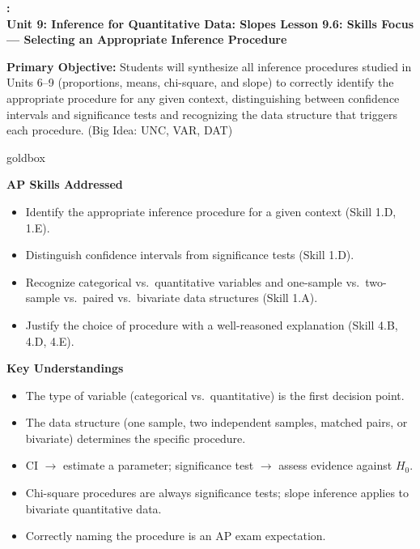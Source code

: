 \documentclass[10pt]{article}
\newcommand{\UnitNumberName}{Unit 9: Inference for Quantitative Data: Slopes \quad}
\newcommand{\LessonNumberName}{Lesson 9.6: Skills Focus --- Selecting an Appropriate Inference Procedure}
\begin{document}
\begin{center}
    {\Large\bfseries \CourseName: \SchoolYear \\
    {\small\bfseries \UnitNumberName \LessonNumberName}}
\end{center}

\begin{tcolorbox}[colback=sky, colframe=navy, boxrule=0.9pt, arc=2mm,
    left=2mm, right=2mm, top=1.5mm, bottom=1.5mm]
    \textbf{Primary Objective:} Students will synthesize all inference procedures studied
    in Units 6--9 (proportions, means, chi-square, and slope) to correctly identify the
    appropriate procedure for any given context, distinguishing between confidence intervals
    and significance tests and recognizing the data structure that triggers each procedure.
    (Big Idea: UNC, VAR, DAT)
\end{tcolorbox}

\renewcommand{\arraystretch}{1.6}
\begin{skillbox}{goldbox}
\begin{minipage}[t]{0.48\linewidth}
    \textbf{AP Skills Addressed}
    \begin{itemize}
        \item Identify the appropriate inference procedure for a given context (Skill 1.D, 1.E).
        \item Distinguish confidence intervals from significance tests (Skill 1.D).
        \item Recognize categorical vs.\ quantitative variables and one-sample vs.\ two-sample
              vs.\ paired vs.\ bivariate data structures (Skill 1.A).
        \item Justify the choice of procedure with a well-reasoned explanation (Skill 4.B, 4.D, 4.E).
    \end{itemize}
\end{minipage}
\hfill
\begin{minipage}[t]{0.48\linewidth}
    \textbf{Key Understandings}
    \begin{itemize}
        \item The type of variable (categorical vs.\ quantitative) is the first decision point.
        \item The data structure (one sample, two independent samples, matched pairs, or bivariate)
              determines the specific procedure.
        \item CI $\to$ estimate a parameter; significance test $\to$ assess evidence against $H_0$.
        \item Chi-square procedures are always significance tests; slope inference applies to
              bivariate quantitative data.
        \item Correctly naming the procedure is an AP exam expectation.
    \end{itemize}
\end{minipage}
\end{skillbox}
\end{document}
